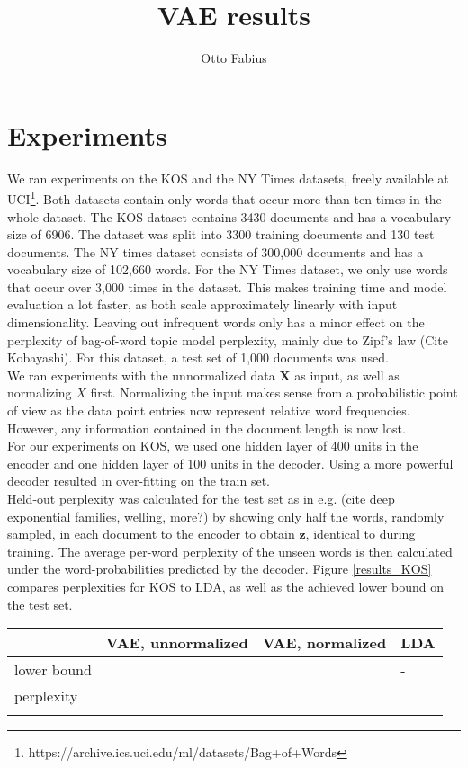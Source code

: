 \documentclass{article}
\author{Otto Fabius}
\title{VAE results}
\begin{document}
	
	\maketitle
	\section{Experiments}
	
	We ran experiments on the KOS and the NY Times datasets, freely available at UCI\footnote{https://archive.ics.uci.edu/ml/datasets/Bag+of+Words}. Both datasets contain only words that occur more than ten times in the whole dataset. The KOS dataset contains 3430 documents and has a vocabulary size of 6906. The dataset was split into 3300 training documents and 130 test documents. The NY times dataset consists of 300,000 documents and has a vocabulary size of 102,660 words. For the NY Times dataset, we only use words that occur over 3,000 times in the dataset. This makes training time and model evaluation a lot faster, as both scale approximately linearly with input dimensionality. Leaving out infrequent words only has a minor effect on the perplexity of bag-of-word topic model perplexity, mainly due to Zipf's law (Cite Kobayashi). For this dataset, a test set of 1,000 documents was used.
	\\
	We ran experiments with the unnormalized data $\mathbf{X}$ as input, as well as normalizing $X$ first. Normalizing the input makes sense from a probabilistic point of view as the data point entries now represent relative word frequencies. However, any information contained in the document length is now lost. 
	\\
	For our experiments on KOS, we used one hidden layer of 400 units in the encoder and one hidden layer of 100 units in the decoder.  Using a more powerful decoder resulted in over-fitting on the train set. 
	\\
	Held-out perplexity was calculated for the test set as in e.g. (cite deep exponential families, welling, more?) by showing only half the words, randomly sampled, in each document to the encoder to obtain $\mathbf{z}$, identical to during training. The average per-word perplexity of the unseen words is then calculated under the word-probabilities predicted by the decoder.  Figure \ref{results_KOS} compares perplexities for KOS to LDA, as well as the achieved lower bound on the test set.
	\\

	
	\begin{tabular}{l|l|l|l}
		& VAE, unnormalized & VAE, normalized & LDA  \\
		\hline
		lower bound & & & - \\
		\hline
		perplexity & & & \\
		\label{results_KOS}
	\end{tabular}
	

	
	
\end{document}
